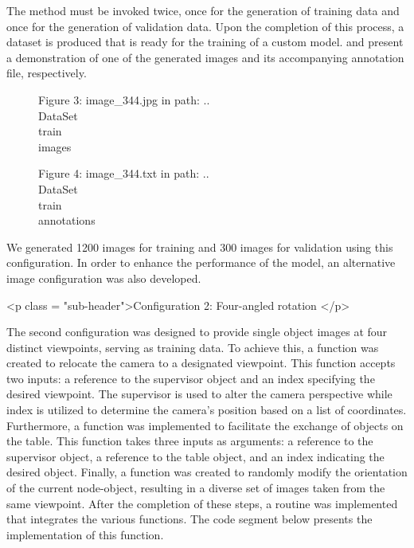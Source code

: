 The method must be invoked twice, once for the generation of training data and once for the generation of validation data. Upon the completion of this process, a dataset is produced that is ready for the training of a custom model.  and  present a demonstration of one of the generated images and its accompanying annotation file, respectively.

\begin{figure}[!h]
    \centering
    \caption{Figure 3: image\_344.jpg in path: ..\\DataSet\\train\\images  }
    \label{fig:dataset_train_img}
\end{figure}

\begin{figure}[!h]
    \centering
    \caption{Figure 4: image\_344.txt in path: ..\\DataSet\\train\\annotations  }
    \label{fig:dataset_train_ann}
\end{figure}

We generated 1200 images for training and 300 images for validation using this configuration. In order to enhance the performance of the model, an alternative image configuration was also developed.

<p class = "sub-header">Configuration 2: Four-angled rotation </p>

The second configuration was designed to provide single object images at four distinct viewpoints, serving as training data. To achieve this, a function was created to relocate the camera to a designated viewpoint. This function accepts two inputs: a reference to the supervisor object and an index specifying the desired viewpoint. The supervisor is used to alter the camera perspective while index is utilized to determine the camera's position based on a list of coordinates. Furthermore, a function was implemented to facilitate the exchange of objects on the table. This function takes three inputs as arguments: a reference to the supervisor object, a reference to the table object, and an index indicating the desired object. Finally, a function was created to randomly modify the orientation of the current node-object, resulting in a diverse set of images taken from the same viewpoint. After the completion of these steps, a routine was implemented that integrates the various functions. The code segment below presents the implementation of this function. 

